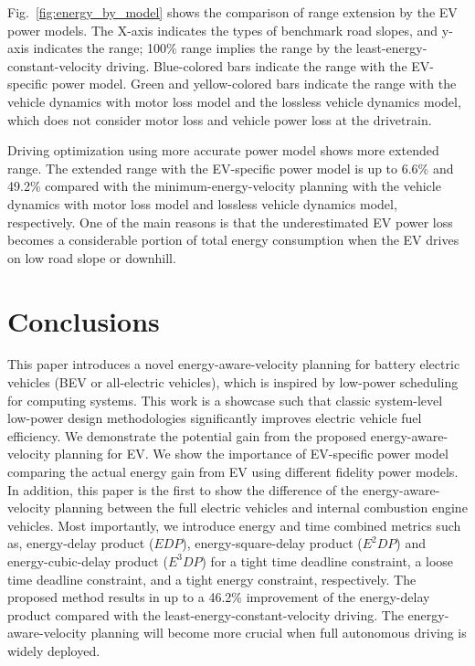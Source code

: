 \documentclass{IEEEtran}
\begin{document}
Fig.~\ref{fig:energy_by_model} shows the comparison of range extension by the EV power models. The X-axis indicates the types of benchmark road slopes, and y-axis indicates the range; 100\%  range implies the range by the least-energy-constant-velocity driving. Blue-colored bars indicate the range with the EV-specific power model. Green and yellow-colored bars indicate the range with the vehicle dynamics with motor loss model and the lossless vehicle dynamics model, which does not consider motor loss and vehicle power loss at the drivetrain.

Driving optimization using more accurate power model shows more extended range. The extended range with the EV-specific power model is up to 6.6\% and 49.2\% compared with the minimum-energy-velocity planning with the vehicle dynamics with motor loss model and lossless vehicle dynamics model, respectively. One of the main reasons is that the underestimated EV power loss becomes a considerable portion of total energy consumption when the EV drives on low road slope or downhill.

\section{Conclusions} \label{sec:conclusions}

This paper introduces a novel energy-aware-velocity planning for battery electric vehicles (BEV or all-electric vehicles), which is inspired by low-power scheduling for computing systems. This work is a showcase such that classic system-level  low-power design methodologies significantly improves electric vehicle fuel efficiency. We demonstrate the potential gain from the proposed energy-aware-velocity planning for EV. We show the importance of EV-specific power model  comparing the actual energy gain from EV using different fidelity power models. In addition, this paper is the first to show the difference of the energy-aware-velocity planning between the full electric vehicles and internal combustion engine vehicles. Most importantly, we introduce energy and time combined metrics such as, energy-delay product ($EDP$), energy-square-delay product ($E^2DP$) and energy-cubic-delay product ($E^3DP$) for a tight time deadline constraint, a loose time deadline constraint, and a tight energy constraint, respectively. 
The proposed method results in up to a  46.2\% improvement of the energy-delay product compared with the least-energy-constant-velocity driving. 
The energy-aware-velocity planning will become more crucial when full autonomous driving is widely deployed.
\end{document}
